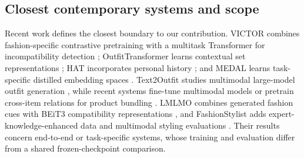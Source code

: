 \documentclass[preprint,12pt]{elsarticle}
\begin{document}
\subsection{Closest contemporary systems and scope}

Recent work defines the closest boundary to our contribution. VICTOR combines fashion-specific contrastive pretraining with a multitask Transformer for incompatibility detection \cite{papadopoulos2023victor}; OutfitTransformer learns contextual set representations \cite{sarkar2023outfittransformer}; HAT incorporates personal history \cite{jung2025hat}; and MEDAL learns task-specific distilled embedding spaces \cite{sanny2026medal}. Text2Outfit studies multimodal large-model outfit generation \cite{zhai2025text2outfit}, while recent systems fine-tune multimodal models or pretrain cross-item relations for product bundling \cite{liu2025bundlemllm,ma2024cirp}. LMLMO combines generated fashion cues with BEiT3 compatibility representations \cite{chang2025large}, and FashionStylist adds expert-knowledge-enhanced data and multimodal styling evaluations \cite{feng2026fashionstylist}. Their results concern end-to-end or task-specific systems, whose training and evaluation differ from a shared frozen-checkpoint comparison.
\end{document}
